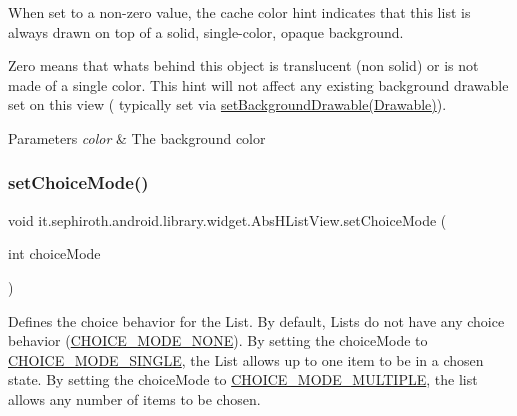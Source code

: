 When set to a non-\/zero value, the cache color hint indicates that this list is always drawn on top of a solid, single-\/color, opaque background.

Zero means that what\textquotesingle{}s behind this object is translucent (non solid) or is not made of a single color. This hint will not affect any existing background drawable set on this view ( typically set via \hyperlink{}{set\+Background\+Drawable(\+Drawable)}).


\begin{DoxyParams}{Parameters}
{\em color} & The background color \\
\hline
\end{DoxyParams}
\mbox{\label{classit_1_1sephiroth_1_1android_1_1library_1_1widget_1_1_abs_h_list_view_aac2532ddba38bddaecf4a009a9aa96fb}} 
\subsubsection{\texorpdfstring{set\+Choice\+Mode()}{setChoiceMode()}}
{\footnotesize\ttfamily void it.\+sephiroth.\+android.\+library.\+widget.\+Abs\+H\+List\+View.\+set\+Choice\+Mode (\begin{DoxyParamCaption}\item[{int}]{choice\+Mode }\end{DoxyParamCaption})}

Defines the choice behavior for the List. By default, Lists do not have any choice behavior (\hyperlink{}{C\+H\+O\+I\+C\+E\+\_\+\+M\+O\+D\+E\+\_\+\+N\+O\+NE}). By setting the choice\+Mode to \hyperlink{}{C\+H\+O\+I\+C\+E\+\_\+\+M\+O\+D\+E\+\_\+\+S\+I\+N\+G\+LE}, the List allows up to one item to be in a chosen state. By setting the choice\+Mode to \hyperlink{}{C\+H\+O\+I\+C\+E\+\_\+\+M\+O\+D\+E\+\_\+\+M\+U\+L\+T\+I\+P\+LE}, the list allows any number of items to be chosen.


